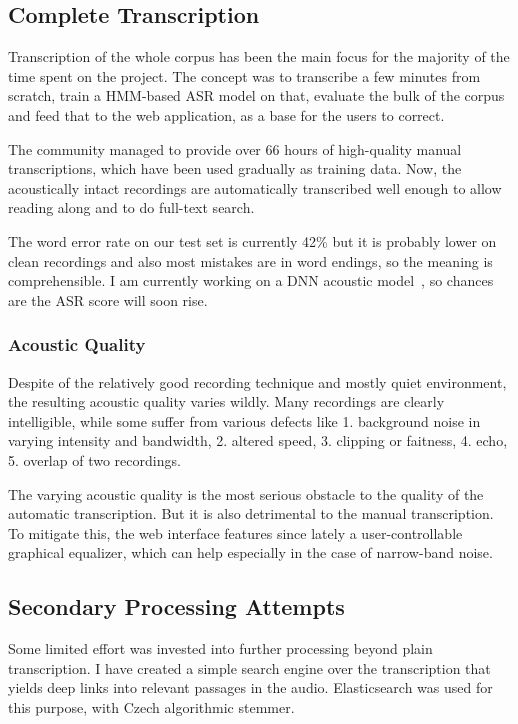 \documentclass[a4paper,11pt]{article}
\begin{document}
\subsection{Complete Transcription}

Transcription of the whole corpus has been the main focus for the majority of
the time spent on the project. The concept was to transcribe a few minutes from
scratch, train a HMM-based ASR model on that, evaluate the bulk of the corpus
and feed that to the web application, as a base for the users to correct.

The community managed to provide over 66 hours of high-quality manual
transcriptions, which have been used gradually as training data. Now, the
acoustically intact recordings are automatically transcribed well enough to
allow reading along and to do full-text search.

The word error rate on our test set is currently 42\% but it is probably lower
on clean recordings and also most mistakes are in word endings, so the meaning
is comprehensible. I am currently working on a DNN acoustic
model~\cite{hannun2014deep}, so chances are the ASR score will soon rise.

\subsubsection{Acoustic Quality}

Despite of the relatively good recording technique and mostly quiet environment,
the resulting acoustic quality varies wildly. Many recordings are clearly
intelligible, while some suffer from various defects like
1. background noise in varying intensity and bandwidth,
2. altered speed,
3. clipping or faitness,
4. echo,
5. overlap of two recordings.

The varying acoustic quality is the most serious obstacle to the quality of the
automatic transcription. But it is also detrimental to the manual transcription.
To mitigate this, the web interface features since lately a user-controllable
graphical equalizer, which can help especially in the case of narrow-band noise.

\subsection{Secondary Processing Attempts}

Some limited effort was invested into further processing beyond plain
transcription. I have created a simple search engine over the transcription that
yields deep links into relevant passages in the audio. Elasticsearch was used
for this purpose, with Czech algorithmic stemmer.
\end{document}
